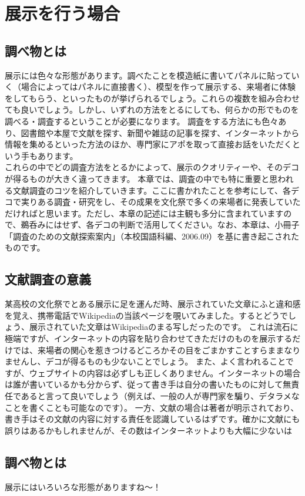 \documentclass[book, twoside, paper=b5j, fleqn, jafontsize=9pt, jafontscale=1, head_space=22mm, foot_space=9mm, fore-edge=16mm, gutter=25mm, hanging_punctuation]{jlreq}
\begin{document}
\section{展示を行う場合}
\subsection{調べ物とは}
展示には色々な形態があります。調べたことを模造紙に書いてパネルに貼っていく（場合によってはパネルに直接書く）、模型を作って展示する、来場者に体験をしてもらう、といったものが挙げられるでしょう。これらの複数を組み合わせても良いでしょう。しかし、いずれの方法をとるにしても、何らかの形でものを調べる・調査するということが必要になります。
調査をする方法にも色々あり、図書館や本屋で文献を探す、新聞や雑誌の記事を探す、インターネットから情報を集めるといった方法のほか、専門家にアポを取って直接お話をいただくという手もあります。\\これらの中でどの調査方法をとるかによって、展示のクオリティーや、そのデコが得るものが大きく違ってきます。
本章では、調査の中でも特に重要と思われる文献調査のコツを紹介していきます。ここに書かれたことを参考にして、各デコで実りある調査・研究をし、その成果を文化祭で多くの来場者に発表していただければと思います。ただし、本章の記述には主観も多分に含まれていますので、鵜呑みにはせず、各デコの判断で活用してください。なお、本章は、小冊子「調査のための文献探索案内」（本校国語科編、2006.09）を基に書き起こされたものです。
\subsection{文献調査の意義}
某高校の文化祭でとある展示に足を運んだ時、展示されていた文章にふと違和感を覚え、携帯電話でWikipediaの当該ページを覗いてみました。するとどうでしょう、展示されていた文章はWikipediaのまる写しだったのです。
これは流石に極端ですが、インターネットの内容を貼り合わせてきただけのものを展示するだけでは、来場者の関心を惹きつけるどころかその目をごまかすことすらままなりませんし、デコが得るものも少ないことでしょう。
また、よく言われることですが、ウェブサイトの内容は必ずしも正しくありません。インターネットの場合は誰が書いているかも分からず、従って書き手は自分の書いたものに対して無責任であると言って良いでしょう（例えば、一般の人が専門家を騙り、デタラメなことを書くことも可能なのです）。
一方、文献の場合は著者が明示されており、書き手はその文献の内容に対する責任を認識しているはずです。確かに文献にも誤りはあるかもしれませんが、その数はインターネットよりも大幅に少ないは
\subsection{調べ物とは}
展示にはいろいろな形態がありますね〜！
\end{document}
